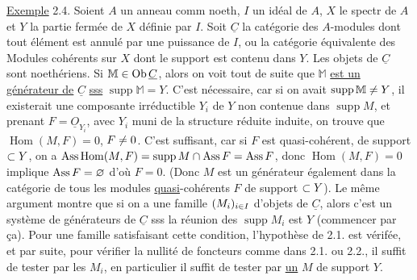 \uline{Exemple} 2.4. Soient $A$ un anneau comm noeth, $I$ un idéal de $A$, $X$ le spectr
de $A$ et $Y$ la partie fermée de $X$ définie par $I$. Soit $\underline C$ la catégorie des
$A$-modules  dont tout élément est annulé par une puissance de $I$, ou la catégorie équivalente des Modules cohérents sur $X$ dont le support est
contenu dans $Y$. Les objets de $\underline C$ sont noethériens. Si $\mathbb M\in\mathrm{Ob}\,\underline C$, alors on
voit tout de suite que $\mathbb M$ \uline{est un générateur de} $\underline C$ \uline{sss} $\operatorname{supp}\mathbb M=Y$. C'est
nécessaire, car si on avait $\operatorname{supp}\mathbb M\ne Y$, il existerait une composante
irréductible $Y_i$ de $Y$ non contenue dans $\operatorname{supp}M$, et prenant $F=\underline O_{Y_i}$, avec
$Y_i$ muni de la structure réduite induite, on trouve que $\operatorname{Hom}(M,F)=0$, $F\ne0$.
C'est suffisant, car si  $F$ est  quasi-cohérent, de support
$\subset Y$, on a $\operatorname{Ass}\operatorname{Hom}(M,F)=\operatorname{supp}M\cap\operatorname{Ass}F=\operatorname{Ass}F$, donc $\operatorname{Hom}(M,F)=0$ implique
$\operatorname{Ass}F=\varnothing$ d'où $F=0$. \deleted{\unsure{(}}(Donc $M$ est un générateur également dans la catégorie de tous les modules \uline{quasi}-cohérents $F$ de support $\subset Y$).  Le même argument montre que si on a une
famille $(M_i)_{i\in I}$ d'objets de $\underline C$, alors c'est un système de générateurs de $\underline C$
sss la réunion des $\operatorname{supp}M_i$ est $Y$ (commencer par ça). Pour une famille
satisfaisant cette condition, l'hypothèse de 2.1. est vérifée, et par
suite, pour vérifier la nullité de foncteurs comme dans 2.1. ou 2.2.,
il suffit de tester par les $M_i$,  en particulier il suffit
de tester par \uline{un} $M$ de support $Y$.

